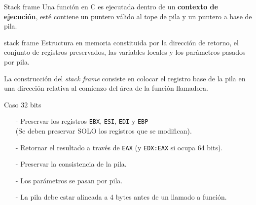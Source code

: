 \documentclass[aspectratio=169]{beamer}
\begin{document}
\begin{frame}{Stack frame}
    Una función en C es ejecutada dentro de un \textbf{contexto de ejecución}, esté contiene un puntero válido al tope de pila y un puntero a base de pila.
    \vspace{0.5cm}
    \pause
    \begin{block}{stack frame}
    Estructura en memoria constituida por la dirección de retorno, el conjunto de registros preservados, las variables locales y los parámetros pasados por pila.
    \end{block}
    \pause
    \vspace{0.5cm}
    La construcción del \emph{stack frame} consiste en colocar el registro base de la pila en una dirección relativa al comienzo del área de la función llamadora.
\end{frame}

\begin{frame}{Caso 32 bits}
    \begin{itemize}
    \setlength\itemsep{0.3cm}
    \item[-] Preservar los registros \texttt{EBX}, \texttt{ESI}, \texttt{EDI} y \texttt{EBP}\\
    (Se deben preservar SOLO los registros que se modifican).
    \pause
    \item[-] Retornar el resultado a través de \texttt{EAX} (y \texttt{EDX:EAX} si ocupa 64 bits).
    \pause
    \item[-] Preservar la consistencia de la pila.
    \pause
    \item[-] Los parámetros se pasan por pila.
    \pause
    \item[-] La pila debe estar alineada a 4 bytes antes de un llamado a función.
    \end{itemize}
\end{frame}
\end{document}
